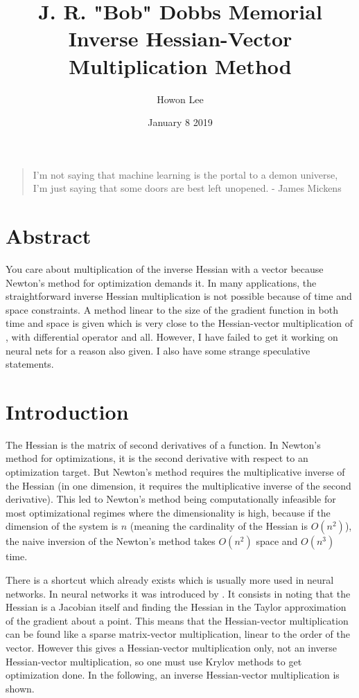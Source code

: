 \documentclass{article}
\begin{document}
\title{J. R. "Bob" Dobbs Memorial Inverse Hessian-Vector Multiplication Method}
\author{Howon Lee}
\date{January 8 2019}
\maketitle

\begin{quote}
I'm not saying that machine learning is the portal to a demon universe, I'm just saying that some doors are best left unopened. - James Mickens
\end{quote}

\section{Abstract}
You care about multiplication of the inverse Hessian with a vector because Newton's method for optimization demands it. In many applications, the straightforward inverse Hessian multiplication is not possible because of time and space constraints. A method linear to the size of the gradient function in both time and space is given which is very close to the Hessian-vector multiplication of \cite{pearlmutter1994}, with differential operator and all. However, I have failed to get it working on neural nets for a reason also given. I also have some strange speculative statements.

\section{Introduction}

The Hessian is the matrix of second derivatives of a function. In Newton's method for optimizations, it is the second derivative with respect to an optimization target. But Newton's method requires the multiplicative inverse of the Hessian (in one dimension, it requires the multiplicative inverse of the second derivative). This led to Newton's method being computationally infeasible for most optimizational regimes where the dimensionality is high, because if the dimension of the system is $n$ (meaning the cardinality of the Hessian is $O(n^2)$), the naive inversion of the Newton's method takes $O(n^2)$ space and $O(n^3)$ time.

There is a shortcut which already exists which is usually more used in neural networks. In neural networks it was introduced by \cite{pearlmutter1994}. It consists in noting that the Hessian is a Jacobian itself and finding the Hessian in the Taylor approximation of the gradient about a point. This means that the Hessian-vector multiplication can be found like a sparse matrix-vector multiplication, linear to the order of the vector. However this gives a Hessian-vector multiplication only, not an inverse Hessian-vector multiplication, so one must use Krylov methods to get optimization done\cite{martens2010}. In the following, an inverse Hessian-vector multiplication is shown.
\end{document}
